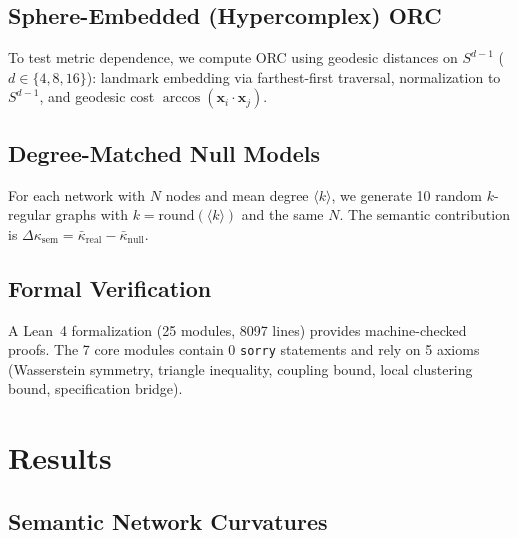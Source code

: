 \documentclass[11pt,a4paper]{article}
\newcommand{\kbar}{\bar{\kappa}}
\newcommand{\kavg}{\langle k \rangle}
\newcommand{\Dksem}{\Delta\kappa_{\text{sem}}}
\begin{document}
\subsection{Sphere-Embedded (Hypercomplex) ORC}

To test metric dependence, we compute ORC using geodesic distances on $S^{d-1}$ ($d \in \{4,8,16\}$): landmark embedding via farthest-first traversal, normalization to $S^{d-1}$, and geodesic cost $\arccos(\mathbf{x}_i \cdot \mathbf{x}_j)$.

\subsection{Degree-Matched Null Models}

For each network with $N$ nodes and mean degree $\kavg$, we generate 10 random $k$-regular graphs with $k = \mathrm{round}(\kavg)$ and the same $N$. The semantic contribution is $\Dksem = \kbar_{\mathrm{real}} - \kbar_{\mathrm{null}}$.

\subsection{Formal Verification}

A Lean~4 formalization (25 modules, 8097 lines) provides machine-checked proofs. The 7 core modules contain 0 \texttt{sorry} statements and rely on 5 axioms (Wasserstein symmetry, triangle inequality, coupling bound, local clustering bound, specification bridge).


\section{Results}
\label{sec:results}

\subsection{Semantic Network Curvatures}
\end{document}

